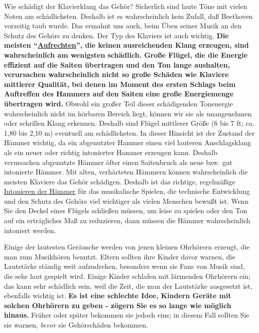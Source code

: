 Wie schädigt der Klavierklang das Gehör?
Sicherlich sind laute Töne mit vielen Noten am schädlichsten.
Deshalb ist es wahrscheinlich kein Zufall, daß Beethoven vorzeitig taub wurde.
Das ermahnt uns auch, beim Üben seiner Musik an den Schutz des Gehörs zu denken.
Der Typ des Klaviers ist auch wichtig.
\textbf{Die meisten \enquote{\hyperref[upright]{Aufrechten}}, die keinen ausreichenden Klang erzeugen, sind wahrscheinlich am wenigsten schädlich.
Große Flügel, die die Energie effizient auf die Saiten übertragen und den Ton lange aushalten, verursachen wahrscheinlich nicht so große Schäden wie Klaviere mittlerer Qualität, bei denen im Moment des ersten Schlags beim Auftreffen des Hammers auf den Saiten eine große Energiemenge übertragen wird.}
Obwohl ein großer Teil dieser schädigenden Tonenergie wahrscheinlich nicht im hörbaren Bereich liegt, können wir sie als unangenehmen oder schrillen Klang erkennen.
Deshalb sind Flügel mittlerer Größe (6 bis 7 ft; ca. 1,80 bis 2,10 m) eventuell am schädlichsten.
In dieser Hinsicht ist der Zustand der Hämmer wichtig, da ein abgenutzter Hammer einen viel lauteren Anschlagsklang als ein neuer oder richtig intonierter Hammer erzeugen kann.
Deshalb verursachen abgenutzte Hämmer öfter einen Saitenbruch als neue bzw. gut intonierte Hämmer.
Mit alten, verhärteten Hämmern können wahrscheinlich die meisten Klaviere das Gehör schädigen.
Deshalb ist das richtige, regelmäßige \hyperref[c2_7_hamm]{Intonieren der Hämmer} für das musikalische Spielen, die technische Entwicklung und den Schutz des Gehörs viel wichtiger als vielen Menschen bewußt ist.
Wenn Sie den Deckel eines Flügels schließen müssen, um leise zu spielen oder den Ton auf ein erträgliches Maß zu reduzieren, dann müssen die Hämmer wahrscheinlich intoniert werden.

Einige der lautesten Geräusche werden von jenen kleinen Ohrhörern erzeugt, die man zum Musikhören benutzt.
Eltern sollten ihre Kinder davor warnen, die Lautstärke ständig weit aufzudrehen, besonders wenn sie Fans von Musik sind, die sehr laut gespielt wird.
Einige Kinder schlafen mit lärmenden Ohrhörern ein; das kann sehr schädlich sein, weil die Zeit, die man der Lautstärke ausgesetzt ist, ebenfalls wichtig ist.
\textbf{Es ist eine schlechte Idee, Kindern Geräte mit solchen Ohrhörern zu geben - zögern Sie es so lange wie möglich hinaus.}
Früher oder später bekommen sie jedoch eins; in diesem Fall sollten Sie sie warnen, \textit{bevor} sie Gehörschäden bekommen.

